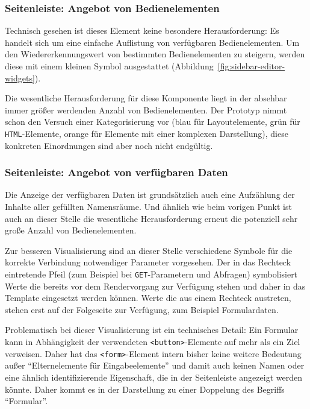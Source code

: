 \subsubsection{Seitenleiste: Angebot von Bedienelementen}

Technisch gesehen ist dieses Element keine besondere Herausforderung: Es handelt sich um eine einfache Auflistung von verfügbaren Bedienelementen. Um den Wiedererkennungswert von bestimmten Bedienelementen zu steigern, werden diese mit einem kleinen Symbol ausgestattet (Abbildung~\ref{fig:sidebar-editor-widgets}).

Die wesentliche Herausforderung für diese Komponente liegt in der absehbar immer größer werdenden Anzahl von Bedienelementen. Der Prototyp nimmt schon den Versuch einer Kategorisierung vor (blau für Layoutelemente, grün für \texttt{HTML}-Elemente, orange für Elemente mit einer komplexen Darstellung), diese konkreten Einordnungen sind aber noch nicht endgültig.

\subsubsection{Seitenleiste: Angebot von verfügbaren Daten}

Die Anzeige der verfügbaren Daten ist grundsätzlich auch eine Aufzählung der Inhalte aller gefüllten Namensräume. Und ähnlich wie beim vorigen Punkt ist auch an dieser Stelle die wesentliche Herausforderung erneut die potenziell sehr große Anzahl von Bedienelementen.

Zur besseren Visualisierung sind an dieser Stelle verschiedene Symbole für die korrekte Verbindung notwendiger Parameter vorgesehen. Der in das Rechteck eintretende Pfeil (zum Beispiel bei \texttt{GET}-Parametern und Abfragen) symbolisiert Werte die bereits vor dem Rendervorgang zur Verfügung stehen und daher in das Template eingesetzt werden können. Werte die aus einem Rechteck austreten, stehen erst auf der Folgeseite zur Verfügung, zum Beispiel Formulardaten.

Problematisch bei dieser Visualisierung ist ein technisches Detail: Ein Formular kann in Abhängigkeit der verwendeten \texttt{<button>}-Elemente auf mehr als ein Ziel verweisen. Daher hat das \texttt{<form>}-Element intern bisher keine weitere Bedeutung außer "`Elternelemente für Eingabeelemente"' und damit auch keinen Namen oder eine ähnlich identifizierende Eigenschaft, die in der Seitenleiste angezeigt werden könnte. Daher kommt es in der Darstellung zu einer Doppelung des Begriffs "`Formular"'.

